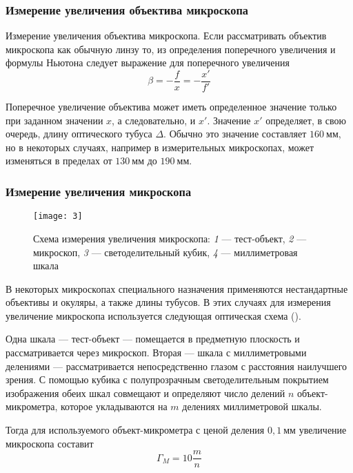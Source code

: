 \documentclass[a4paper, 12pt]{article}
\begin{document}
\subsubsection*{Измерение увеличения объектива микроскопа}
Измерение увеличения объектива микроскопа. Если рассматривать объектив
микроскопа как обычную линзу то, из определения поперечного увеличения
и формулы Ньютона следует выражение для поперечного увеличения
\begin{equation}
    \beta = - \frac{f}{x} = - \frac{x'}{f'}
    \label{eq:2}
\end{equation}

Поперечное увеличение объектива может иметь определенное значение
только при заданном значении $x$, а следовательно, и $x'$. Значение
$x'$
определяет, в свою очередь, длину оптического тубуса $\Delta$. Обычно это
значение составляет $160\ \text{мм}$, но в некоторых случаях, например в
измерительных микроскопах, может изменяться в пределах от $130\
\text{мм}$ до $190\ \text{мм}$.

\subsubsection*{Измерение увеличения микроскопа}

\begin{wrapfigure}{r}{0.4\linewidth}
    \vspace{-20pt}
    \texttt{[image: 3]}
    \caption{Схема измерения увеличения микроскопа: \textit{1} ---
    тест-объект, \textit{2} --- микроскоп, \textit{3} ---
светоделительный кубик, \textit{4} --- миллиметровая шкала}
\label{fig:three}
\end{wrapfigure}

В некоторых микроскопах специального назначения применяются
нестандартные объективы и окуляры, а также длины тубусов. В этих
случаях для измерения увеличение микроскопа используется следующая
оптическая схема (\fig{fig:three}).

Одна шкала — тест-объект — помещается в предметную плоскость и
рассматривается через микроскоп. Вторая — шкала с миллиметровыми
делениями — рассматривается непосредственно глазом с расстояния
наилучшего зрения. С помощью кубика с полупрозрачным светоделительным
покрытием изображения обеих шкал совмещают и определяют число делений
$n$ объект-микрометра, которое укладываются на $m$ делениях миллиметровой
шкалы.

Тогда для используемого объект-микрометра с ценой деления $0,1\
\text{мм}$ увеличение микроскопа составит 
\begin{equation}
    \Gamma_M = 10 \frac{m}{n}
    \label{eq:Gamma}
\end{equation}
\end{document}
